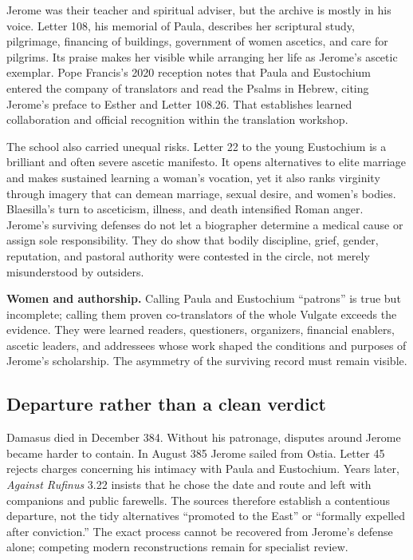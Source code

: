 Jerome was their teacher and spiritual adviser, but the archive is mostly in
his voice. Letter 108, his memorial of Paula, describes her scriptural study,
pilgrimage, financing of buildings, government of women ascetics, and care for
pilgrims. Its praise makes her visible while arranging her life as Jerome's
ascetic exemplar. Pope Francis's 2020 reception notes that Paula and Eustochium
entered the company of translators and read the Psalms in Hebrew, citing
Jerome's preface to Esther and Letter 108.26. That establishes learned
collaboration and official recognition within the translation workshop.

The school also carried unequal risks. Letter 22 to the young Eustochium is a
brilliant and often severe ascetic manifesto. It opens alternatives to elite
marriage and makes sustained learning a woman's vocation, yet it also ranks
virginity through imagery that can demean marriage, sexual desire, and women's
bodies. Blaesilla's turn to asceticism, illness, and death intensified Roman
anger. Jerome's surviving defenses do not let a biographer determine a medical
cause or assign sole responsibility. They do show that bodily discipline,
grief, gender, reputation, and pastoral authority were contested in the circle,
not merely misunderstood by outsiders.

\begin{studyframe}
\textbf{Women and authorship.} Calling Paula and Eustochium ``patrons'' is true
but incomplete; calling them proven co-translators of the whole Vulgate exceeds
the evidence. They were learned readers, questioners, organizers, financial
enablers, ascetic leaders, and addressees whose work shaped the conditions and
purposes of Jerome's scholarship. The asymmetry of the surviving record must
remain visible.
\end{studyframe}

\subsection{Departure rather than a clean verdict}

Damasus died in December 384. Without his patronage, disputes around Jerome
became harder to contain. In August 385 Jerome sailed from Ostia. Letter 45
rejects charges concerning his intimacy with Paula and Eustochium. Years later,
\emph{Against Rufinus} 3.22 insists that he chose the date and route and left
with companions and public farewells. The sources therefore establish a
contentious departure, not the tidy alternatives ``promoted to the East'' or
``formally expelled after conviction.'' The exact process cannot be recovered
from Jerome's defense alone; competing modern reconstructions remain for
specialist review.

